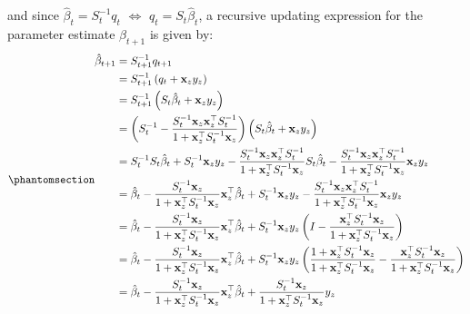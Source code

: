 \documentclass[
  letterpaper,
  DIV=11,
  numbers=noendperiod]{scrreprt}
\begin{document}
and since \(\hat{\beta}_{t} = S_{t}^{-1} q_{t}\) \(\Leftrightarrow\)
\(q_{t} = S_{t} \hat{\beta}_{t}\), a recursive updating expression for
the parameter estimate \(\hat{\beta}_{t+1}\) is given by:
\begin{equation}\protect\phantomsection\label{eq-RLS}{
\begin{align}
    \hat{\beta}_{t+1} &= S_{t+1}^{-1} q_{t+1} \nonumber \\
    &= S_{t+1}^{-1} \left(q_t + \mathbf{x}_{z} y_{z} \right) \nonumber \\
    &= S_{t+1}^{-1} \left(S_{t} \hat{\beta}_{t} + \mathbf{x}_{z} y_{z} \right) \nonumber \\
    &= \left(S_t^{-1} - \frac{S_t^{-1} \mathbf{x}_z \mathbf{x}_z^{\top} S_t^{-1}} {1 + \mathbf{x}_z^{\top} S_t^{-1} \mathbf{x}_z} \right) \left(S_{t} \hat{\beta}_{t} + \mathbf{x}_{z} y_{z} \right) \nonumber \\
    &= S_t^{-1} S_{t} \hat{\beta}_{t}  
       + S_t^{-1} \mathbf{x}_{z} y_{z} 
        - \frac{S_t^{-1} \mathbf{x}_z \mathbf{x}_z^{\top} S_t^{-1}} {1 + \mathbf{x}_z^{\top} S_t^{-1} \mathbf{x}_z} S_{t} \hat{\beta}_{t}  
        -  \frac{S_t^{-1} \mathbf{x}_z \mathbf{x}_z^{\top} S_t^{-1}} {1 + \mathbf{x}_z^{\top} S_t^{-1} \mathbf{x}_z} \mathbf{x}_z y_{z} \nonumber \\
   &=  \hat{\beta}_{t} - \frac{S_t^{-1} \mathbf{x}_z } {1 + \mathbf{x}_z^{\top} S_t^{-1} \mathbf{x}_z}  \mathbf{x}_z^{\top} \hat{\beta}_{t}  
        + S_t^{-1} \mathbf{x}_z y_{z} -  \frac{S_t^{-1} \mathbf{x}_z \mathbf{x}_z^{\top} S_t^{-1}} {1 + \mathbf{x}_z^{\top} S_t^{-1} \mathbf{x}_z} \mathbf{x}_{z} y_{z} \nonumber \\
   &=  \hat{\beta}_{t} - \frac{S_t^{-1} \mathbf{x}_z } {1 + \mathbf{x}_z^{\top} S_t^{-1} \mathbf{x}_z}  \mathbf{x}_z^{\top} \hat{\beta}_{t} 
    + S_t^{-1} \mathbf{x}_{z} y_{z} \left( I - \frac{ \mathbf{x}_z^{\top} S_t^{-1} \mathbf{x}_{z} } {1 + \mathbf{x}_z^{\top} S_t^{-1} \mathbf{x}_z} \right) \nonumber \\
   &=  \hat{\beta}_{t} - \frac{S_t^{-1} \mathbf{x}_z } {1 + \mathbf{x}_z^{\top} S_t^{-1} \mathbf{x}_z}  \mathbf{x}_z^{\top} \hat{\beta}_{t} 
    + S_t^{-1} \mathbf{x}_{z} y_{z} \left( \frac{1 + \mathbf{x}_z^{\top} S_t^{-1} \mathbf{x}_z}{1 + \mathbf{x}_z^{\top} S_t^{-1} \mathbf{x}_z} - \frac{ \mathbf{x}_z^{\top} S_t^{-1} \mathbf{x}_{z} } {1 + \mathbf{x}_z^{\top} S_t^{-1} \mathbf{x}_z} \right) \nonumber \\
   &=  \hat{\beta}_{t} - \frac{S_t^{-1} \mathbf{x}_z } {1 + \mathbf{x}_z^{\top} S_t^{-1} \mathbf{x}_z}  \mathbf{x}_z^{\top} \hat{\beta}_{t} 
   +  \frac{S_t^{-1} \mathbf{x}_{z} } {1 + \mathbf{x}_z^{\top} S_t^{-1} \mathbf{x}_z} y_{z}
\end{align}
}\end{equation}
\end{document}
